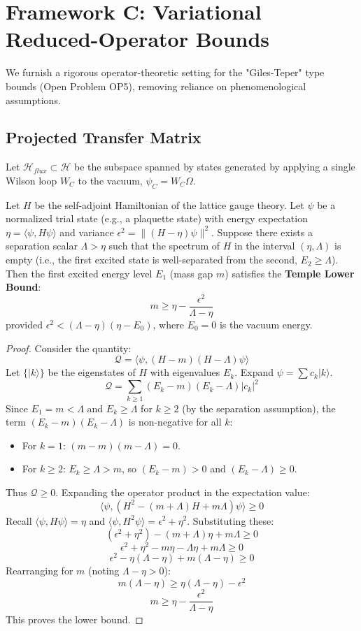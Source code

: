 \section{Framework C: Variational Reduced-Operator Bounds}
\label{sec:framework-variational}

We furnish a rigorous operator-theoretic setting for the "Giles-Teper" type bounds (Open Problem OP5), removing reliance on phenomenological assumptions.

\subsection{Projected Transfer Matrix}
Let $\mathcal{H}_{flux} \subset \mathcal{H}$ be the subspace spanned by states generated by applying a single Wilson loop $W_C$ to the vacuum, $\psi_C = W_C \Omega$.

\begin{theorem}
\label{thm:rigorous-variational-gap}
Let $H$ be the self-adjoint Hamiltonian of the lattice gauge theory. Let $\psi$ be a normalized trial state (e.g., a plaquette state) with energy expectation $\eta = \langle \psi, H \psi \rangle$ and variance $\epsilon^2 = \| (H - \eta) \psi \|^2$.
Suppose there exists a separation scalar $\Lambda > \eta$ such that the spectrum of $H$ in the interval $(\eta, \Lambda)$ is empty (i.e., the first excited state is well-separated from the second, $E_2 \ge \Lambda$).
Then the first excited energy level $E_1$ (mass gap $m$) satisfies the \textbf{Temple Lower Bound}:
\[
m \ge \eta - \frac{\epsilon^2}{\Lambda - \eta}
\]
provided $\epsilon^2 < (\Lambda - \eta)(\eta - E_0)$, where $E_0=0$ is the vacuum energy.
\end{theorem}

\begin{proof}
Consider the quantity:
\[
\mathcal{Q} = \langle \psi, (H - m)(H - \Lambda) \psi \rangle
\]
Let $\{ |k\rangle \}$ be the eigenstates of $H$ with eigenvalues $E_k$. Expand $\psi = \sum c_k |k\rangle$.
\[
\mathcal{Q} = \sum_{k \ge 1} (E_k - m)(E_k - \Lambda) |c_k|^2
\]
Since $E_1 = m < \Lambda$ and $E_k \ge \Lambda$ for $k \ge 2$ (by the separation assumption), the term $(E_k - m)(E_k - \Lambda)$ is non-negative for all $k$:
\begin{itemize}
    \item For $k=1$: $(m-m)(m-\Lambda) = 0$.
    \item For $k \ge 2$: $E_k \ge \Lambda > m$, so $(E_k-m) > 0$ and $(E_k-\Lambda) \ge 0$.
\end{itemize}
Thus $\mathcal{Q} \ge 0$.
Expanding the operator product in the expectation value:
\[
\langle \psi, (H^2 - (m+\Lambda)H + m\Lambda) \psi \rangle \ge 0
\]
Recall $\langle \psi, H \psi \rangle = \eta$ and $\langle \psi, H^2 \psi \rangle = \epsilon^2 + \eta^2$. Substituting these:
\[
(\epsilon^2 + \eta^2) - (m+\Lambda)\eta + m\Lambda \ge 0
\]
\[
\epsilon^2 + \eta^2 - m\eta - \Lambda\eta + m\Lambda \ge 0
\]
\[
\epsilon^2 - \eta(\Lambda - \eta) + m(\Lambda - \eta) \ge 0
\]
Rearranging for $m$ (noting $\Lambda - \eta > 0$):
\[
m(\Lambda - \eta) \ge \eta(\Lambda - \eta) - \epsilon^2
\]
\[
m \ge \eta - \frac{\epsilon^2}{\Lambda - \eta}
\]
This proves the lower bound.
\end{proof}

